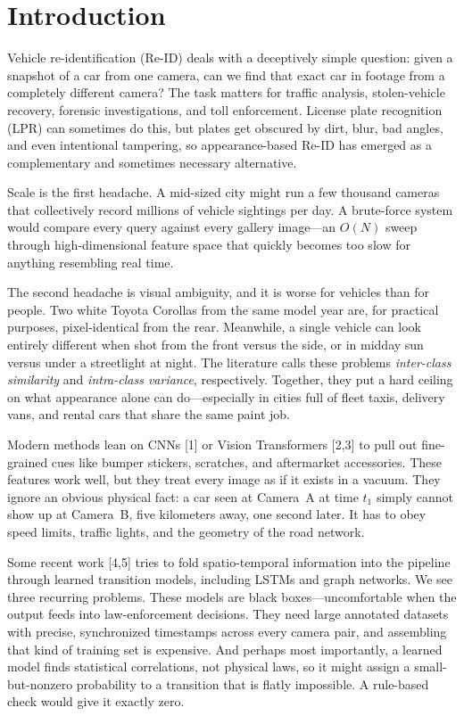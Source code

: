 \documentclass{ijitcs}
\author*{Chris Thomas Saji}{\crx{Department of Artificial Intelligence and Data Science}, Rajagiri School of Engineering \& Technology (Autonomous), Kochi, India}{chris.saji001@gmail.com}{https://orcid.org/0009-0005-4425-0540}
\author{Jithin Mathews}{\crx{Department of Artificial Intelligence and Data Science}, Rajagiri School of Engineering \& Technology (Autonomous), Kochi, India}{jithinm@rajagiritech.edu.in}{https://orcid.org/0000-0001-6279-7279}
\begin{document}
\maketitle


\section{Introduction}
Vehicle re-identification (Re-ID) deals with a deceptively simple question: given a snapshot of a car from one camera, can we find that exact car in footage from a completely different camera? The task matters for traffic analysis, stolen-vehicle recovery, forensic investigations, and toll enforcement. License plate recognition (LPR) can sometimes do this, but plates get obscured by dirt, blur, bad angles, and even intentional tampering, so appearance-based Re-ID has emerged as a complementary and sometimes necessary alternative.

Scale is the first headache. A mid-sized city might run a few thousand cameras that collectively record millions of vehicle sightings per day. A brute-force system would compare every query against every gallery image---an $O(N)$ sweep through high-dimensional feature space that quickly becomes too slow for anything resembling real time.

The second headache is visual ambiguity, and it is worse for vehicles than for people. Two white Toyota Corollas from the same model year are, for practical purposes, pixel-identical from the rear. Meanwhile, a single vehicle can look entirely different when shot from the front versus the side, or in midday sun versus under a streetlight at night. The literature calls these problems \textit{inter-class similarity} and \textit{intra-class variance}, respectively. Together, they put a hard ceiling on what appearance alone can do---especially in cities full of fleet taxis, delivery vans, and rental cars that share the same paint job.

Modern methods lean on CNNs [1] or Vision Transformers [2,3] to pull out fine-grained cues like bumper stickers, scratches, and aftermarket accessories. These features work well, but they treat every image as if it exists in a vacuum. They ignore an obvious physical fact: a car seen at Camera~A at time $t_1$ simply cannot show up at Camera~B, five kilometers away, one second later. It has to obey speed limits, traffic lights, and the geometry of the road network.

Some recent work [4,5] tries to fold spatio-temporal information into the pipeline through learned transition models, including LSTMs and graph networks. We see three recurring problems. These models are black boxes---uncomfortable when the output feeds into law-enforcement decisions. They need large annotated datasets with precise, synchronized timestamps across every camera pair, and assembling that kind of training set is expensive. And perhaps most importantly, a learned model finds statistical correlations, not physical laws, so it might assign a small-but-nonzero probability to a transition that is flatly impossible. A rule-based check would give it exactly zero.
\end{document}
